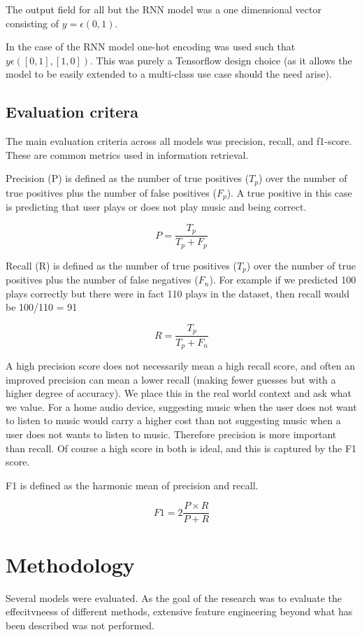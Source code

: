 The output field for all but the RNN model was a one dimensional vector consisting of $y = \epsilon (0,1)$.

In the case of the RNN model one-hot encoding was used such that $y \epsilon ([0,1],[1,0])$. This was purely a Tensorflow design choice (as it allows the model to be easily extended to a multi-class use case should the need arise).

\section{Evaluation critera}

The main evaluation criteria across all models was precision, recall, and f1-score. These are common metrics used in information retrieval. 

Precision (P) is defined as the number of true positives  ($T_p$) over the number of true positives plus the number of false positives ($F_p$). A true positive in this case is predicting that user plays or does not play music and being correct.

$$P = \frac{T_p}{T_p+F_p}$$

Recall (R) is defined as the number of true positives ($T_p$) over the number of true positives plus the number of false negatives ($F_n$). For example if we predicted 100 plays correctly but there were in fact 110 plays in the dataset, then recall would be 100/110 = 91%

$$R = \frac{T_p}{T_p + F_n}$$

A high precision score does not necessarily mean a high recall score, and often an improved precision can mean a lower recall (making fewer guesses but with a higher degree of accuracy). We place this in the real world context and ask what we value. For a home audio device, suggesting music when the user does not want to listen to music would carry a higher cost than not suggesting music when a user does not wants to listen to music. Therefore precision is more important than recall. Of course a high score in both is ideal, and this is captured by the F1 score.

F1 is defined as the harmonic mean of precision and recall.

$$F1 = 2\frac{P \times R}{P+R}$$

\chapter{Methodology} %

Several models were evaluated. As the goal of the research was to evaluate the effecitvneess of different methods, extensive feature engineering beyond what has been described was not performed. 


